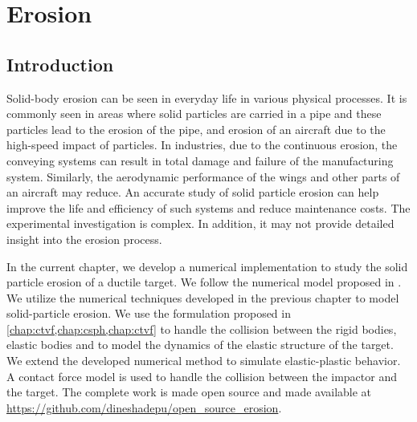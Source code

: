 \chapter{Erosion}
\label{chap:erosion}

\section{Introduction}
\label{sec:intro}
Solid-body erosion can be seen in everyday life in various physical processes.
It is commonly seen in areas where solid particles are carried in a pipe and
these particles lead to the erosion of the pipe, and erosion of an aircraft due
to the high-speed impact of particles. In industries, due to the continuous
erosion, the conveying systems can result in total damage and failure of the
manufacturing system. Similarly, the aerodynamic performance of the wings and
other parts of an aircraft may reduce. An accurate study of solid particle
erosion can help improve the life and efficiency of such systems and reduce
maintenance costs. The experimental investigation is complex. In addition, it
may not provide detailed insight into the erosion process.

In the current chapter, we develop a numerical implementation to study the solid
particle erosion of a ductile target. We follow the numerical model proposed in
\citep{takaffoli2009finite,dong2016smoothed}. We utilize the numerical
techniques developed in the previous chapter to model solid-particle erosion. We
use the formulation proposed in \cref{chap:ctvf,chap:csph,chap:ctvf} to handle
the collision between the rigid bodies, elastic bodies and to model the dynamics
of the elastic structure of the target. We extend the developed numerical method
to simulate elastic-plastic behavior. A contact force model is used to handle
the collision between the impactor and the target. The complete work is made
open source and made available at
\url{https://github.com/dineshadepu/open_source_erosion}.

